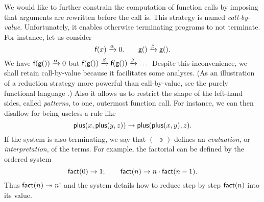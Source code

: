 We would like to further constrain the computation of function calls
by imposing that arguments are rewritten before the call is. This
strategy is named \emph{call\hyp{}by\hyp{}value}.\label{def:call-by-value} Unfortunately, it
enables otherwise terminating programs to not terminate. For instance,
let us consider
\begin{equation*}
\textsf{f}(x) \xrightarrow{\smash{\alpha}} 0.\qquad
\textsf{g}() \xrightarrow{\smash{\beta}} \textsf{g}().
\end{equation*}
We have \(\textsf{f}(\textsf{g}()) \xrightarrow{\smash{\alpha}} 0\) but
\(\textsf{f}(\textsf{g}()) \xrightarrow{\smash{\beta}} \textsf{f}(\textsf{g}())
\xrightarrow{\smash{\beta}} \dots\) Despite this inconvenience, we
shall retain call\hyp{}by\hyp{}value because it facilitates some
analyses. (As an illustration of a reduction strategy more powerful
than call-by-value, see the purely functional language \Haskell
\citep{DoetsVanEijck_2004}.) Also it allows us to restrict the shape
of the left\hyp{}hand sides, called \emph{patterns}, to one, outermost function call. For instance, we
can then disallow for being useless a rule like
\begin{equation*}
\textsf{plus}(x,\textsf{plus}(y,z)) \rightarrow
\textsf{plus}(\textsf{plus}(x,y),z).
\end{equation*}
If the system is also terminating, we say that
\((\twoheadrightarrow)\) defines an \emph{evaluation}, or \emph{interpretation}, of the terms. For example,
the factorial
 can be defined by the ordered
system
\begin{equation}
\textsf{fact}(0) \rightarrow 1;\qquad
\textsf{fact}(n) \rightarrow n \cdot \textsf{fact}(n-1).
\label{def:fact}
\end{equation}
Thus \(\textsf{fact}(n) \twoheadrightarrow n!\) and the system details
how to reduce step by step \(\textsf{fact}(n)\) into its value.


